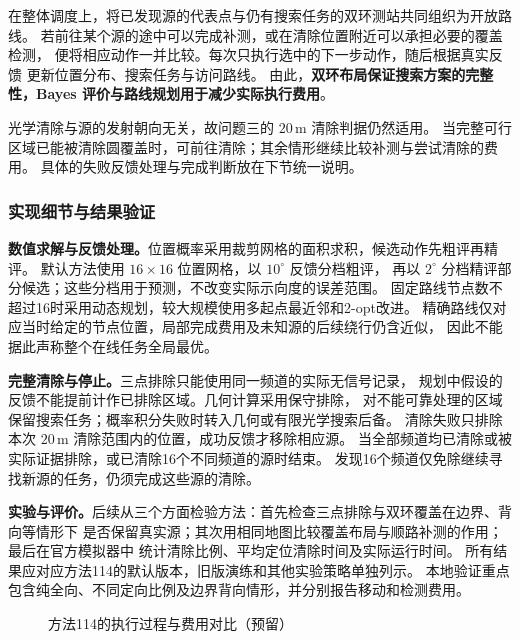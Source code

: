 \documentclass[UTF8,a4paper,12pt]{ctexart}
\begin{document}
在整体调度上，将已发现源的代表点与仍有搜索任务的双环测站共同组织为开放路线。
若前往某个源的途中可以完成补测，或在清除位置附近可以承担必要的覆盖检测，
便将相应动作一并比较。每次只执行选中的下一步动作，随后根据真实反馈
更新位置分布、搜索任务与访问路线。
由此，\textbf{双环布局保证搜索方案的完整性，Bayes 评价与路线规划用于减少实际执行费用}。

光学清除与源的发射朝向无关，故问题三的 $20\,\mathrm m$ 清除判据仍然适用。
当完整可行区域已能被清除圆覆盖时，可前往清除；其余情形继续比较补测与尝试清除的费用。
具体的失败反馈处理与完成判断放在下节统一说明。

\subsubsection{实现细节与结果验证}

\textbf{数值求解与反馈处理。}位置概率采用裁剪网格的面积求积，候选动作先粗评再精评。
默认方法使用 $16\times16$ 位置网格，以 $10^\circ$ 反馈分档粗评，
再以 $2^\circ$ 分档精评部分候选；这些分档用于预测，不改变实际示向度的误差范围。
固定路线节点数不超过16时采用动态规划，较大规模使用多起点最近邻和2-opt改进。
精确路线仅对应当时给定的节点位置，局部完成费用及未知源的后续绕行仍含近似，
因此不能据此声称整个在线任务全局最优。

\textbf{完整清除与停止。}三点排除只能使用同一频道的实际无信号记录，
规划中假设的反馈不能提前计作已排除区域。几何计算采用保守排除，
对不能可靠处理的区域保留搜索任务；概率积分失败时转入几何或有限光学搜索后备。
清除失败只排除本次 $20\,\mathrm m$ 清除范围内的位置，成功反馈才移除相应源。
当全部频道均已清除或被实际证据排除，或已清除16个不同频道的源时结束。
发现16个频道仅免除继续寻找新源的任务，仍须完成这些源的清除。

\textbf{实验与评价。}后续从三个方面检验方法：首先检查三点排除与双环覆盖在边界、背向等情形下
是否保留真实源；其次用相同地图比较覆盖布局与顺路补测的作用；最后在官方模拟器中
统计清除比例、平均定位清除时间及实际运行时间。
所有结果应对应方法114的默认版本，旧版演练和其他实验策略单独列示。
本地验证重点包含纯全向、不同定向比例及边界背向情形，并分别报告移动和检测费用。

\begin{figure}[htbp]
  \centering
  \caption{方法114的执行过程与费用对比（预留）}
  \label{fig:q4-validation}
\end{figure}
\end{document}
